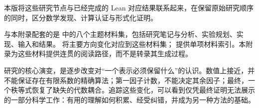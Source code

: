 \documentclass[11pt,a4paper]{article}
\begin{document}
本版将这些研究节点与已经完成的 Lean 对应结果联系起来，在保留原始研究顺序的同时，区分数学发现、计算认证与形式化证明。

与本附录配套的是  中的八个主题材料集，包括研究笔记与分析、实验规划、实现、输入和结果。 将主要方向变化对应到这些材料集； 提供单项材料索引。本附录为这些材料提供连贯的阅读路径，而不是转录其生成过程。

研究的核心演变，是逐步改变对“一个表示必须保留什么”的认识。数值上接近，并不能保证存在有限系数的精确算法；第一因子计数，不能决定其余因子；最终，一个秩等式恢复了缺失的代数耦合。追踪这些变化，可以看到仅凭最终证明无法展示的一部分科学工作：有用的理解如何积累、经受纠错，并成为另一种方法的基础。


\FloatBarrier

\FloatBarrier
{}
{}
\ifQiushiHasCitations
\fi
\end{document}
